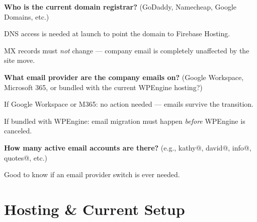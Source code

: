 \documentclass[11pt, letterpaper]{article}
\begin{document}
\begin{checklist}
  \item \textbf{Who is the current domain registrar?}
    (GoDaddy, Namecheap, Google Domains, etc.)
    \begin{checklist}
      \item DNS access is needed at launch to point the domain to Firebase Hosting.
      \item MX records must \emph{not} change --- company email is completely
            unaffected by the site move.
    \end{checklist}

  \item \textbf{What email provider are the company emails on?}
    (Google Workspace, Microsoft 365, or bundled with the current WPEngine hosting?)
    \begin{checklist}
      \item If Google Workspace or M365: no action needed --- emails survive the transition.
      \item If bundled with WPEngine: email migration must happen \emph{before}
            WPEngine is canceled.
    \end{checklist}

  \item \textbf{How many active email accounts are there?}
    (e.g., kathy@, david@, info@, quotes@, etc.)
    \begin{checklist}
      \item Good to know if an email provider switch is ever needed.
    \end{checklist}
\end{checklist}

\section{Hosting \& Current Setup}
\end{document}
